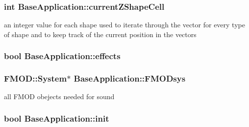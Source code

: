 \hypertarget{class_base_application_a9bff1519bcaf61fc3cbcc3c66ec273a3}{
\subsubsection[{current\-Z\-Shape\-Cell}]{\setlength{\rightskip}{0pt plus 5cm}int Base\-Application\-::current\-Z\-Shape\-Cell\hspace{0.3cm}{\ttfamily [protected]}}}\label{class_base_application_a9bff1519bcaf61fc3cbcc3c66ec273a3}
an integer value for each shape used to iterate through the vector for every type of shape and to keep track of the current position in the vectors \hypertarget{class_base_application_a4a21a832334bce0266af82d97208c5d1}{
\subsubsection[{effects}]{\setlength{\rightskip}{0pt plus 5cm}bool Base\-Application\-::effects\hspace{0.3cm}{\ttfamily [protected]}}}\label{class_base_application_a4a21a832334bce0266af82d97208c5d1}
\hypertarget{class_base_application_ac45b5d8be5f852e28d13b2009c45b5a5}{
\subsubsection[{F\-M\-O\-Dsys}]{\setlength{\rightskip}{0pt plus 5cm}F\-M\-O\-D\-::\-System$\ast$ Base\-Application\-::\-F\-M\-O\-Dsys\hspace{0.3cm}{\ttfamily [protected]}}}\label{class_base_application_ac45b5d8be5f852e28d13b2009c45b5a5}
all F\-M\-O\-D obejects needed for sound \hypertarget{class_base_application_adadae473e6c936a899153c205c2de07d}{
\subsubsection[{init}]{\setlength{\rightskip}{0pt plus 5cm}bool Base\-Application\-::init\hspace{0.3cm}{\ttfamily [protected]}}}\label{class_base_application_adadae473e6c936a899153c205c2de07d}
